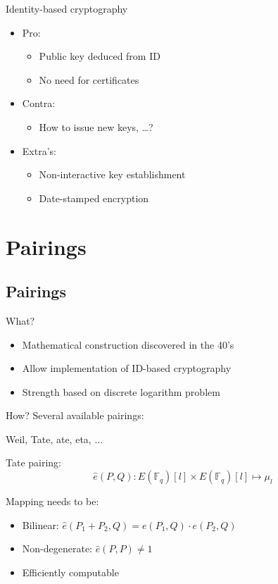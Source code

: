 \documentclass[svgnames, handout,t]{beamer}
\begin{document}
\begin{frame}{Identity-based cryptography}
	\begin{itemize}
		\item Pro:
			\begin{itemize}
				\item Public key deduced from ID
				\item No need for certificates
			\end{itemize}
		\item Contra:
			\begin{itemize}
				\item How to issue new keys, \ldots ?
			\end{itemize}
		\item Extra's:
			\begin{itemize}
				\item Non-interactive key establishment
				\item Date-stamped encryption
			\end{itemize}
	\end{itemize}
\end{frame}

\section{Pairings}
\subsection*{Pairings}
\begin{frame}{What?}
	\begin{itemize}
		\item Mathematical construction discovered in the 40's
		\item Allow implementation of ID-based cryptography
		\item Strength based on discrete logarithm problem
	\end{itemize}
\end{frame}

\begin{frame}{How?}
	Several available pairings:
	\begin{center}Weil, \alert{Tate}, ate, eta, $\ldots$\end{center}
	
	Tate pairing:	
	\[ \hat{e}(P, Q) : E(\mathbb{F}_q)[l] \times E(\mathbb{F}_q)[l] \mapsto \mu _l \]
	
	Mapping needs to be:	
	\begin{itemize}
		\item<1-> Bilinear: $\hat{e}(P_1 + P_2, Q) = e(P_1, Q) \cdot e(P_2, Q)$
		\item<1-> Non-degenerate: $\hat{e}(P, P) \neq 1$
		\item<1-> Efficiently computable
	\end{itemize}
	

\end{frame}
\end{document}
